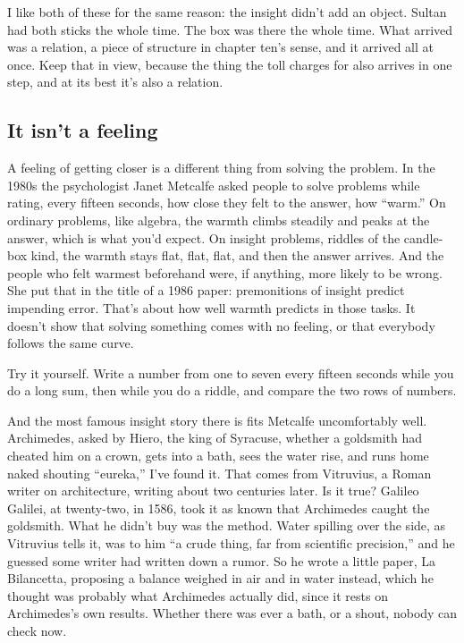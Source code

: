 \documentclass[11pt,twoside]{article}
\theoremstyle{thielethm}
\theoremstyle{thieledef}
\theoremstyle{thieledef}
\theoremstyle{thieledef}
\theoremstyle{thielethm}
\theoremstyle{thieleobs}
\theoremstyle{thielethm}
\begin{document}
I like both of these for the same reason: the insight didn't add an object. Sultan had both sticks the whole time. The box was there the whole time. What arrived was a relation, a piece of structure in chapter ten's sense, and it arrived all at once. Keep that in view, because the thing the toll charges for also arrives in one step, and at its best it's also a relation.

\subsection{It isn't a feeling}

A feeling of getting closer is a different thing from solving the problem. In the 1980s the psychologist Janet Metcalfe asked people to solve problems while rating, every fifteen seconds, how close they felt to the answer, how ``warm.'' On ordinary problems, like algebra, the warmth climbs steadily and peaks at the answer, which is what you'd expect. On insight problems, riddles of the candle-box kind, the warmth stays flat, flat, flat, and then the answer arrives. And the people who felt warmest beforehand were, if anything, more likely to be wrong. She put that in the title of a 1986 paper: premonitions of insight predict impending error. That's about how well warmth predicts in those tasks. It doesn't show that solving something comes with no feeling, or that everybody follows the same curve.

Try it yourself. Write a number from one to seven every fifteen seconds while you do a long sum, then while you do a riddle, and compare the two rows of numbers.

And the most famous insight story there is fits Metcalfe uncomfortably well. Archimedes, asked by Hiero, the king of Syracuse, whether a goldsmith had cheated him on a crown, gets into a bath, sees the water rise, and runs home naked shouting ``eureka,'' I've found it. That comes from Vitruvius, a Roman writer on architecture, writing about two centuries later. Is it true? Galileo Galilei, at twenty-two, in 1586, took it as known that Archimedes caught the goldsmith. What he didn't buy was the method. Water spilling over the side, as Vitruvius tells it, was to him ``a crude thing, far from scientific precision,'' and he guessed some writer had written down a rumor. So he wrote a little paper, La Bilancetta, proposing a balance weighed in air and in water instead, which he thought was probably what Archimedes actually did, since it rests on Archimedes's own results. Whether there was ever a bath, or a shout, nobody can check now.
\end{document}
